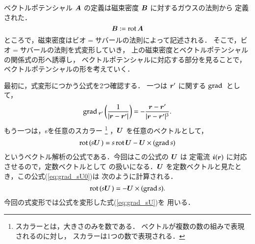             ベクトルポテンシャル $\boldsymbol{A}$ の定義は磁束密度 $\boldsymbol{B}$ に対するガウスの法則から
            定義された．
                \begin{equation*}
                    \boldsymbol{B} := \mathrm{rot}\, \boldsymbol{A}
                \end{equation*}
            ところで，磁束密度はビオ$=$サバールの法則によって記述される．
            そこで，ビオ$=$サバールの法則を式変形していき，
            上の磁束密度とベクトルポテンシャルの関係式の形へ誘導し，
            ベクトルポテンシャルに対応する部分を見ることで，ベクトルポテンシャルの形を考えていく．

            最初に，式変形につかう公式を2つ確認する．
            一つは $\boldsymbol{r}'$ に関する $\mathrm{grad}\,$ として，
                \begin{align}\label{eq:grad_r}
                    \dgrad_{\br'} \left( \frac{1}{| \br -\br' |}\right)
                    =-\frac{\br-\br'}{| \br-\br' |^{3}}.
                \end{align}
            もう一つは，sを任意のスカラー
                \footnote{
                    スカラーとは，大きさのみを数である．
                    ベクトルが複数の数の組みで表現されるのに対し，
                    スカラーは1つの数で表現される．
                }
            ，$\boldsymbol{U}$ を任意のベクトルとして，
                \begin{align}\label{eq:grad_sU0}
                    \drot(s\bU\,) = s\,\drot\bU - \bU\times(\dgrad s)
                \end{align}
            というベクトル解析の公式である．今回はこの公式の $\boldsymbol{U}$ は
            定電流 $\boldsymbol{i}(\boldsymbol{r})$ に対応させるので，定数ベクトルとして
            の扱いになる．$\boldsymbol{U}$ を定数ベクトルと見たとき，この公式(\ref{eq:grad_sU0})は
            次のように計算される．
                \begin{align}\label{eq:grad_sU}
                    \drot(s\bU\,) = - \bU\times(\dgrad s).
                \end{align}
            今回の式変形では公式を変形した式(\ref{eq:grad_sU})を
            用いる．

